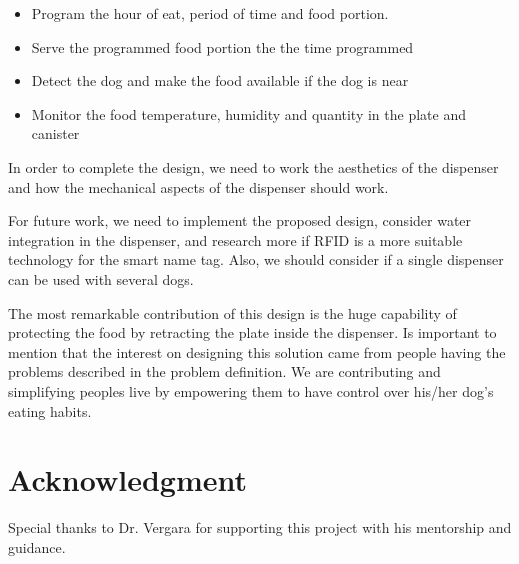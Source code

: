 \documentclass[12pt]{article}
\begin{document}
\begin{itemize}
  \item Program the hour of eat, period of time and food portion.
  \item Serve the programmed food portion the the time programmed
  \item Detect the dog and make the food available if the dog is near
  \item Monitor the food temperature, humidity and quantity in the plate and canister
\end{itemize}

In order to complete the design, we need to work the aesthetics of the dispenser and how the mechanical aspects of the dispenser should work.

For future work, we need to implement the proposed design, consider water integration in the dispenser, and research more if RFID is a more suitable technology for the smart name tag. Also, we should consider if a single dispenser can be used with several dogs.

The most remarkable contribution of this design is the huge capability of protecting the food by retracting the plate inside the dispenser. Is important to mention that the interest on designing this solution came from people having the problems described in the problem definition. We are contributing and simplifying peoples live by empowering them to have control over his/her dog's eating habits.


\section*{Acknowledgment}

Special thanks to Dr. Vergara for supporting this project with his mentorship and guidance.

\newpage

{}
\end{document}
